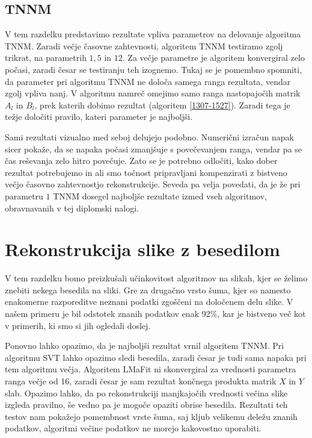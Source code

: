 \subsection{TNNM}
V tem razdelku predstavimo rezultate vpliva parametrov na delovanje algoritma TNNM. Zaradi večje časovne zahtevnosti, algoritem TNNM testiramo zgolj trikrat, na parametrih $1, 5$ in $12$. Za večje parametre je algoritem konvergiral zelo počasi, zaradi česar se testiranju teh izognemo. Tukaj se je pomembno spomniti, da parameter pri algoritmu TNNM ne določa samega ranga rezultata, vendar zgolj vpliva nanj.
V algoritmu namreč omejimo samo ranga nastopajočih matrik $A_l$ in $B_l$, prek katerih dobimo rezultat (algoritem \ref{1307-1527}). Zaradi tega je težje določiti pravilo, kateri parameter je najboljši.

\FloatBarrier


Sami rezultati vizualno med seboj delujejo podobno. Numerični izračun napak sicer pokaže, da se napaka počasi zmanjšuje s povečevanjem ranga, vendar pa se čas reševanja zelo hitro povečuje. Zato se je potrebno odločiti, kako dober rezultat potrebujemo in ali smo točnost pripravljani kompenzirati z bistveno večjo časovno zahtevnostjo rekonstrukcije. Seveda pa velja povedati, da je že pri parametru $1$ TNNM dosegel najboljše rezultate izmed vseh algoritmov, obravnavanih v tej diplomski nalogi.

\section{Rekonstrukcija slike z besedilom} \label{1307-2254}
V tem razdelku bomo preizkušali učinkovitost algoritmov na slikah, kjer se želimo znebiti nekega besedila na sliki. Gre za drugačno vrsto šuma, kjer so namesto enakomerne razporeditve neznani podatki zgoščeni na določenem delu slike. V našem primeru je bil odstotek znanih podatkov enak 92\%, kar je bistveno več kot v primerih, ki smo si jih ogledali doslej.


Ponovno lahko opazimo, da je najboljši rezultat vrnil algoritem TNNM. Pri algoritmu SVT lahko opazimo sledi besedila, zaradi česar je tudi sama napaka pri tem algoritmu večja. Algoritem LMaFit ni skonvergiral za vrednosti parametra ranga večje od 16, zaradi česar je sam rezultat končnega produkta matrik $X$ in $Y$ slab. Opazimo lahko, da po rekonstrukciji  manjkajočih vrednosti večina slike izgleda pravilno, še vedno pa je mogoče opaziti obrise besedila.
Rezultati teh testov nam pokažejo pomembnost vrste šuma, saj kljub velikemu deležu znanih podatkov, algoritmi večine podatkov ne morejo kakovostno uporabiti.

